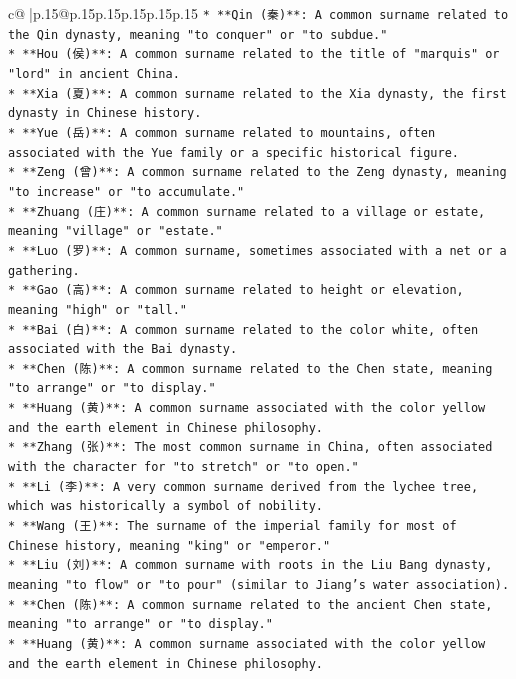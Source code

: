 \documentclass{article}
\begin{document}
{\begin{supertabular}{c@{$\;$}|p{.15\linewidth}@{}p{.15\linewidth}p{.15\linewidth}p{.15\linewidth}p{.15\linewidth}p{.15\linewidth}}
{{{\texttt{*   **Qin (秦)**: A common surname related to the Qin dynasty, meaning "to conquer" or "to subdue."} \\
\texttt{*   **Hou (侯)**: A common surname related to the title of "marquis" or "lord" in ancient China.} \\
\texttt{*   **Xia (夏)**: A common surname related to the Xia dynasty, the first dynasty in Chinese history.} \\
\texttt{*   **Yue (岳)**: A common surname related to mountains, often associated with the Yue family or a specific historical figure.} \\
\texttt{*   **Zeng (曾)**: A common surname related to the Zeng dynasty, meaning "to increase" or "to accumulate."} \\
\texttt{*   **Zhuang (庄)**: A common surname related to a village or estate, meaning "village" or "estate."} \\
\texttt{*   **Luo (罗)**: A common surname, sometimes associated with a net or a gathering.} \\
\texttt{*   **Gao (高)**: A common surname related to height or elevation, meaning "high" or "tall."} \\
\texttt{*   **Bai (白)**: A common surname related to the color white, often associated with the Bai dynasty.} \\
\texttt{*   **Chen (陈)**: A common surname related to the Chen state, meaning "to arrange" or "to display."} \\
\texttt{*   **Huang (黄)**: A common surname associated with the color yellow and the earth element in Chinese philosophy.} \\
\texttt{*   **Zhang (张)**: The most common surname in China, often associated with the character for "to stretch" or "to open."} \\
\texttt{*   **Li (李)**: A very common surname derived from the lychee tree, which was historically a symbol of nobility.} \\
\texttt{*   **Wang (王)**: The surname of the imperial family for most of Chinese history, meaning "king" or "emperor."} \\
\texttt{*   **Liu (刘)**: A common surname with roots in the Liu Bang dynasty, meaning "to flow" or "to pour" (similar to Jiang's water association).} \\
\texttt{*   **Chen (陈)**: A common surname related to the ancient Chen state, meaning "to arrange" or "to display."} \\
\texttt{*   **Huang (黄)**: A common surname associated with the color yellow and the earth element in Chinese philosophy.} \\
}}}
\end{supertabular}}
\end{document}
